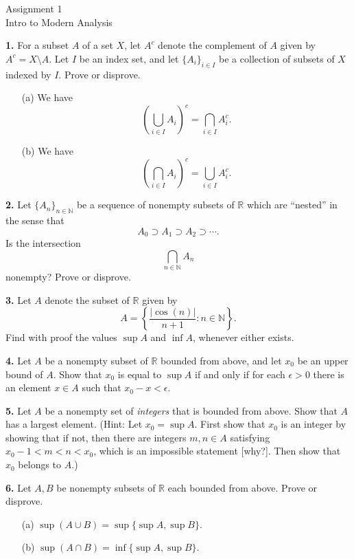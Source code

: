 \documentclass[12pt]{article}
\begin{document}
\begin{center}
Assignment 1\\
Intro to Modern Analysis
\end{center}

\noindent \textbf{1.} For a subset $A$ of a set $X$, let $A^c$ denote the complement of $A$ given by $A^c = X \setminus A$. Let $I$ be an index set, and let $\{A_i\}_{i \in I}$ be a collection of subsets of $X$ indexed by $I$. Prove or disprove.  
\begin{enumerate}
\item[(a)] We have 
\[
\left(\bigcup_{i \in I}A_i\right)^c = \bigcap_{i \in I}A_i^c.
\]
\item[(b)] We have 
\[
\left(\bigcap_{i \in I}A_i\right)^c = \bigcup_{i \in I}A_i^c.
\]
\end{enumerate}

\medskip

\noindent \textbf{2.} Let $\{A_n\}_{n \in \mathbb{N}}$ be a sequence of nonempty subsets of $\mathbb{R}$ which are ``nested'' in the sense that 
\[
A_0 \supset A_1 \supset A_2 \supset \cdots.
\]
Is the intersection 
\[
\bigcap_{n \in\mathbb{N}} A_n
\]
nonempty? Prove or disprove. 

\medskip

\noindent \textbf{3.} Let $A$ denote the subset of $\mathbb{R}$ given by  
\[
A = \left\{\frac{|\cos(n)|}{n+1} : n \in \mathbb{N} \right\}.
\]
Find with proof the values $\sup A$ and $\inf A$, whenever either exists. 

\medskip


\noindent \textbf{4.} Let $A$ be a nonempty subset of $\mathbb{R}$ bounded from above, and let $x_0$ be an upper bound of $A$.  Show that $x_0$ is equal to $\sup A$ if and only if for each $\epsilon > 0$ there is an element $x \in A$ such that $x_0 - x < \epsilon$. 

\medskip 

\noindent \textbf{5.} Let $A$ be a nonempty set of \emph{integers} that is bounded from above. Show that $A$ has a largest element. (Hint: Let $x_0 = \sup A$. First show that $x_0$ is an integer by showing that if not, then there are integers $m,n \in A$ satisfying $x_0 - 1 < m < n < x_0$, which is an impossible statement [why?]. Then show that $x_0$ belongs to $A$.)


\medskip




\noindent \textbf{6.} Let $A, B$ be nonempty subsets of $\mathbb{R}$ each bounded from above. Prove or disprove. 
\begin{enumerate}
\item[(a)] $\sup (A \cup B) = \sup\{ \sup A, \sup B \}$.
\item[(b)] $\sup(A \cap B) = \inf\{ \sup A, \sup B \}$. 
\end{enumerate}
\end{document}
